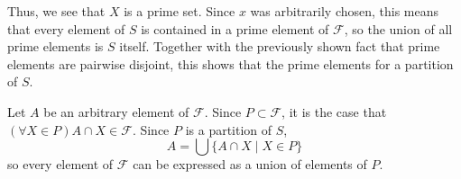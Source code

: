 \documentclass[12pt]{article}
\begin{document}
Thus, we see that $X$ is a prime set.  Since $x$ was arbitrarily
chosen, this means that every element of $S$ is contained in a prime
element of $\mathcal{F}$, so the union of all prime elements is $S$
itself.  Together with the previously shown fact that prime elements
are pairwise disjoint, this shows that the prime elements for a
partition of $S$.

Let $A$ be an arbitrary element of $\mathcal{F}$.  Since $P \subset
\mathcal{F}$, it is the case that $(\forall X \in P) A \cap X \in
\mathcal{F}$.  Since $P$ is a partition of $S$,
 \[ A = \bigcup \{ A \cap X \mid X \in P \} \]
so every element of $\mathcal{F}$ can be expressed as a union of
elements of $P$.
\end{document}
